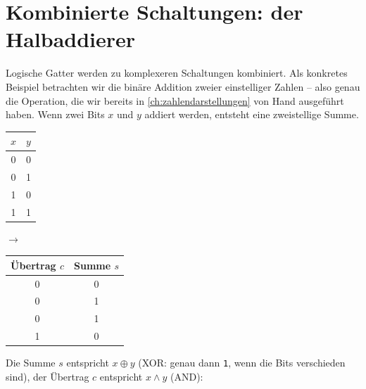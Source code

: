 \section{Kombinierte Schaltungen: der Halbaddierer}\label{sec:halbaddierer}

Logische Gatter werden zu komplexeren Schaltungen kombiniert. Als konkretes Beispiel betrachten wir die binäre Addition zweier einstelliger Zahlen -- also genau die Operation, die wir bereits in \cref{ch:zahlendarstellungen} von Hand ausgeführt haben. Wenn zwei Bits $x$ und $y$ addiert werden, entsteht eine zweistellige Summe.

\begin{center}
    \begin{tabular}{cc}
        $x$ & $y$ \\\midrule
        0 & 0 \\
        0 & 1 \\
        1 & 0 \\
        1 & 1 \\
    \end{tabular}
    \quad$\longrightarrow$\quad
    \begin{tabular}{cc}
        Übertrag $c$ & Summe $s$ \\\midrule
        0 & 0 \\
        0 & 1 \\
        0 & 1 \\
        1 & 0 \\
    \end{tabular}
\end{center}

Die Summe $s$ entspricht $x \oplus y$ (\gls{XOR}: genau dann \texttt{1}, wenn die Bits verschieden sind), der Übertrag $c$ entspricht $x \wedge y$ (AND):

